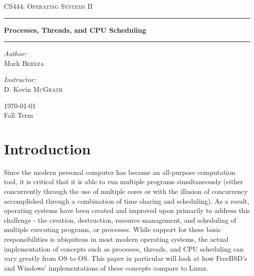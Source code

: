 \documentclass[onecolumn, draftclsnofoot,10pt, compsoc]{IEEEtran}
\begin{document}
\begin{titlepage}
\begin{center}

\vspace*{50mm}

\textsc{\LARGE CS444: Operating Systems II}\\[1.5cm]

\hrule
\vspace{5mm}
{ \huge \bfseries Processes, Threads, and CPU Scheduling \\[0.9cm] }
\hrule 
\vspace{5mm}

\noindent
\begin{minipage}{0.4\textwidth}

\begin{flushleft} \large
\emph{Author:}\\
Mark \textsc{Bereza}
\end{flushleft}
\end{minipage}%
\begin{minipage}{0.4\textwidth}
\begin{flushright} \large
\emph{Instructor:} \\
D. Kevin \textsc{McGrath}
\end{flushright}

\end{minipage}

\vspace*{\fill}
{\large \today}\\
{\large Fall Term}

\end{center}
\end{titlepage}
  
\tableofcontents
\newpage
\renewcommand{\baselinestretch}{1.0}
\linespread{1.0}
\section{Introduction}
Since the modern personal computer has become an all-purpose computation tool, it is critical that it is able to run multiple programs simultaneously (either concurrently through the use of multiple cores or with the illusion of concurrency accomplished through a combination of time sharing and scheduling). As a result, operating systems have been created and improved upon primarily to address this challenge - the creation, destruction, resource management, and scheduling of multiple executing programs, or processes. While support for these basic responsibilities is ubiquitous in most modern operating systems, the actual implementation of concepts such as processes, threads, and CPU scheduling can vary greatly from OS to OS. This paper in particular will look at how FreeBSD's and Windows' implementations of these concepts compare to Linux.
\end{document}

